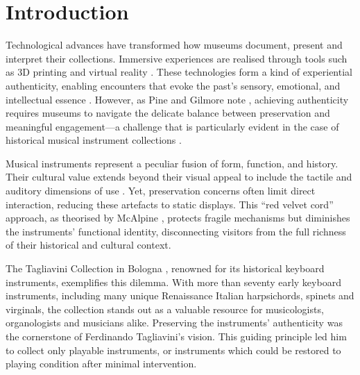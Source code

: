 \section{Introduction}\label{introduction}

Technological advances have transformed how museums document, present and interpret their collections. Immersive experiences are realised through tools such as 3D printing and virtual reality \cite{allard2005use,Wachowiak01082009,RCM_2024_3D,Kuzminsky_LaserScan_2012,Schaich_3D_2007}. These technologies form a kind of experiential authenticity, enabling encounters that evoke the past's sensory, emotional, and intellectual essence \cite{trant_Auth_1999}. However, as Pine and Gilmore note \cite{pinegilmore_2007}, achieving authenticity requires museums to navigate the delicate balance between preservation and meaningful engagement—a challenge that is particularly evident in the case of historical musical instrument collections \cite{McAlpine2014}.

Musical instruments represent a peculiar fusion of form, function, and history. Their cultural value extends beyond their visual appeal to include the tactile and auditory dimensions of use \cite{Fritz2017}. Yet, preservation concerns often limit direct interaction, reducing these artefacts to static displays. This ``red velvet cord'' approach, as theorised by McAlpine \cite{McAlpine2014}, protects fragile mechanisms but diminishes the instruments’ functional identity, disconnecting visitors from the full richness of their historical and cultural context.

The Tagliavini Collection in Bologna \cite{Tagliavini2007}, renowned for its historical keyboard instruments, exemplifies this dilemma. With more than seventy early keyboard instruments, including many unique Renaissance Italian harpsichords, spinets and virginals, the collection stands out as a valuable resource for musicologists, organologists and musicians alike. Preserving the instruments' authenticity was the cornerstone of Ferdinando Tagliavini’s vision. This guiding principle led him to collect only playable instruments, or instruments which could be restored to playing condition after minimal intervention. 

